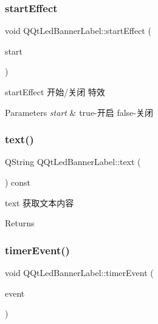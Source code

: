 \subsubsection{\texorpdfstring{start\+Effect}{startEffect}}
{\footnotesize\ttfamily void Q\+Qt\+Led\+Banner\+Label\+::start\+Effect (\begin{DoxyParamCaption}\item[{bool}]{start }\end{DoxyParamCaption})\hspace{0.3cm}{\ttfamily [slot]}}



start\+Effect 开始/关闭 特效 


\begin{DoxyParams}{Parameters}
{\em start} & true-\/开启 false-\/关闭 \\
\hline
\end{DoxyParams}
\mbox{\label{class_q_qt_led_banner_label_a43d0a3391b1a4699d4a4d448e5686157}} 
\subsubsection{\texorpdfstring{text()}{text()}}
{\footnotesize\ttfamily Q\+String Q\+Qt\+Led\+Banner\+Label\+::text (\begin{DoxyParamCaption}{ }\end{DoxyParamCaption}) const}



text 获取文本内容 

\begin{DoxyReturn}{Returns}

\end{DoxyReturn}
\mbox{\label{class_q_qt_led_banner_label_a38ca55a32878473c59f119fa675d3b02}} 
\subsubsection{\texorpdfstring{timer\+Event()}{timerEvent()}}
{\footnotesize\ttfamily void Q\+Qt\+Led\+Banner\+Label\+::timer\+Event (\begin{DoxyParamCaption}\item[{Q\+Timer\+Event $\ast$}]{event }\end{DoxyParamCaption})\hspace{0.3cm}{\ttfamily [protected]}}



